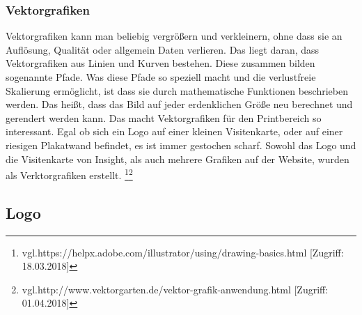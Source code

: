 \subsubsection{Vektorgrafiken}
Vektorgrafiken kann man beliebig vergrößern und verkleinern, ohne dass sie an Auflösung, Qualität oder allgemein Daten verlieren. Das liegt daran, dass Vektorgrafiken aus Linien und Kurven bestehen. Diese zusammen bilden sogenannte Pfade. Was diese Pfade so speziell macht und die verlustfreie Skalierung ermöglicht, ist dass sie durch mathematische Funktionen beschrieben werden. Das heißt, dass das Bild auf jeder erdenklichen Größe neu berechnet und gerendert werden kann. Das macht Vektorgrafiken für den Printbereich so interessant. Egal ob sich ein Logo auf einer kleinen Visitenkarte, oder auf einer riesigen Plakatwand befindet, es ist immer gestochen scharf. Sowohl das Logo und die Visitenkarte von Insight, als auch mehrere Grafiken auf der Website, wurden als Verktorgrafiken erstellt.
\footnote{\label{} vgl.https://helpx.adobe.com/illustrator/using/drawing-basics.html [Zugriff: 18.03.2018]}\footnote{\label{} vgl.http://www.vektorgarten.de/vektor-grafik-anwendung.html [Zugriff: 01.04.2018]}

\subsection{Logo}
